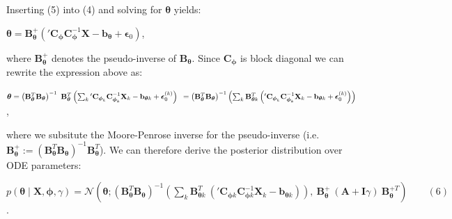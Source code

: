 \begin{par}
Inserting (5) into (4) and solving for $\boldsymbol{\theta}$ yields:
\end{par} \vspace{1em}
\begin{par}
$\boldsymbol{\theta} = \mathbf{B}_{\boldsymbol{\theta}}^+ \left( {'\mathbf{C}_{\boldsymbol{\phi}}}\mathbf{C}_{\boldsymbol{\phi}}^{-1} \mathbf{X} - \mathbf{b}_{\boldsymbol{\theta}} + \boldsymbol{\epsilon}_0\right)$,
\end{par} \vspace{1em}
\begin{par}
where $\mathbf{B}_{\boldsymbol{\theta}}^+$ denotes the pseudo-inverse of $\mathbf{B}_{\boldsymbol{\theta}}$. Since $\mathbf{C}_{\boldsymbol{\phi}}$ is block diagonal we can rewrite the expression above as:
\end{par} \vspace{1em}
\begin{par}
$\boldsymbol{\theta} = \left( \mathbf{B}_{\boldsymbol{\theta}}^T \mathbf{B}_{\boldsymbol{\theta}} \right)^{-1} ~\mathbf{B}_{\boldsymbol{\theta}}^T  \left( \sum_k {'\mathbf{C}_{\boldsymbol{\phi}_k}}\mathbf{C}_{\boldsymbol{\phi}_k}^{-1} \mathbf{X}_k - \mathbf{b}_{\boldsymbol{\theta} k} + \boldsymbol{\epsilon}_0^{(k)} \right)\\ ~= \left( \mathbf{B}_{\boldsymbol{\theta}}^T \mathbf{B}_{\boldsymbol{\theta}} \right)^{-1} \left(\sum_k \mathbf{B}_{\boldsymbol{\theta} k}^T \left( {'\mathbf{C}_{\boldsymbol{\phi}_k}}\mathbf{C}_{\boldsymbol{\phi}_k}^{-1} \mathbf{X}_k - \mathbf{b}_{\boldsymbol{\theta} k} +\boldsymbol{\epsilon}_0^{(k)} \right) \right)$,
\end{par} \vspace{1em}
\begin{par}
where we subsitute the Moore-Penrose inverse for the pseudo-inverse (i.e. $\mathbf{B}_{\boldsymbol{\theta}}^+ := \left( \mathbf{B}_{\boldsymbol{\theta}}^T \mathbf{B}_{\boldsymbol{\theta}}\right)^{-1} \mathbf{B}_{\boldsymbol{\theta}}^T$). We can therefore derive the posterior distribution over ODE parameters:
\end{par} \vspace{1em}
\begin{par}
$p(\boldsymbol{\theta} \mid \mathbf{X}, \boldsymbol{\phi}, \gamma) = \mathcal{N}\left(\boldsymbol{\theta} ; \left( \mathbf{B}_{\boldsymbol{\theta}}^T\mathbf{B}_{\boldsymbol{\theta}} \right)^{-1} \left( \sum_k \mathbf{B}_{\boldsymbol{\theta} k}^T ~\left( {'\mathbf{C}_{\boldsymbol{\phi} k}} \mathbf{C}_{\boldsymbol{\phi} k}^{-1} \mathbf{X}_k -\mathbf{b}_{\boldsymbol{\theta} k} \right) \right), ~ \mathbf{B}_{\boldsymbol{\theta}}^+ ~(\mathbf{A} + \mathbf{I}\gamma) ~ \mathbf{B}_{\boldsymbol{\theta}}^{+T} \right) \qquad (6)$.
\end{par} 


